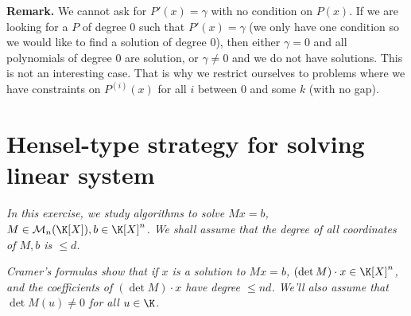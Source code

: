 \documentclass[11pt]{exam}
\theoremstyle{definition}
\newcommand{\M}{\mathcal{M}}
\begin{document}
\begin{questions}
\begin{solution}
  \textbf{Remark.} We cannot ask for $P'(x) = \gamma$ with no condition on $P(x)$. If we are looking for a $P$ of degree $0$ such that $P'(x) = \gamma$ (we only have one condition so we would like to find a solution of degree 0), then either $\gamma = 0$ and all polynomials of degree 0 are solution, or $\gamma \neq 0$ and we do not have solutions. This is not an interesting case. That is why we restrict ourselves to problems where we have constraints on $P^{(i)}(x)$ for all $i$ between 0 and some $k$ (with no gap).
  
  \end{solution}
\end{questions}



\section{Hensel-type strategy for solving linear system}

\emph{In this exercise, we study algorithms to solve $Mx = b$, $M\in
	\M_n(\K[X]), b\in \K[X]^n$. We shall assume that the degree of all
	coordinates of $M, b$ is $\leqslant d$.}
\medskip

{\em Cramer's formulas show that if $x$ is a solution to $Mx = b$,
	$(\det M)\cdot x \in \K[X]^n$, and the coefficients of
	$(\det M)\cdot x$ have degree $\leqslant nd$. We'll also assume that
	$\det M(u) \neq 0$ for all $u \in \K$.}
\medskip
\end{document}

